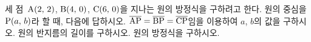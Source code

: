 세 점~$\mathrm{A}(2,\,2)$, $\mathrm{B}(4,\,0)$, $\mathrm{C}(6,\,0)$을 지나는 원의 방정식을 구하려고 한다. 원의 중심을 $\mathrm{P}(a,\,b)$라 할 때, 다음에 답하시오.
 $\overline{\mathrm{AP}}=\overline{\mathrm{BP}}=\overline{\mathrm{CP}}$임을 이용하여 $a$, $b$의 값을 구하시오.
 원의 반지름의 길이를 구하시오.
 원의 방정식을 구하시오.
